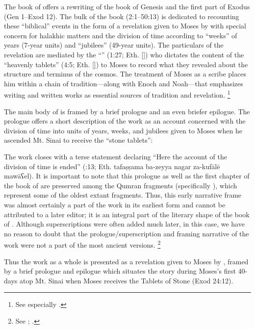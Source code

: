 The book of \jub offers a rewriting of the book of Genesis and the first part of Exodus (Gen 1--Exod 12).\autocite[1:17]{vanderkam2018} The bulk of the book (2:1--50:13) is dedicated to recounting these ``biblical'' events in the form of a revelation given to Moses by \yahweh with special concern for halakhic matters and the division of time according to ``weeks'' of years (7-year units) and ``jubilees'' (49-year units). The particulars of the revelation are mediated by the ``\ap'' (1:27; Eth.  []) who dictates the content of the ``heavenly tablets'' (4:5; Eth.  []) to Moses to record what they revealed about the structure and terminus of the cosmos.\autocite{martinez_najman-tigchelaar2012} The treatment of Moses as a scribe places him within a chain of tradition---along with Enoch and Noah---that emphasizes writing and written works as essential sources of tradition and revelation.%
        \footnote{See especially
                \cite[381--388]{najman_jsj1999}.} 

The main body of \jub is framed by a brief prologue and an even briefer epilogue. The prologue offers a short description of the work as an account concerned with the division of time into units of years, weeks, and jubilees given to Moses when he ascended Mt. Sinai to receive the ``stone tablets'':

%
\noindent
The work closes with a terse statement declaring ``Here the account of the division of time is ended'' (:13; Eth. 
        {tafaṣṣama ba-zeyya nagar za-kufālē mawāʕel}).
\noindent
It is important to note that this prologue as well as the first chapter of the book of \jub are preserved among the Qumran fragments (specifically ), which represent some of the oldest extant \jub fragments. Thus, this early narrative frame was almost certainly a part of the work in its earliest form and cannot be attributed to a later editor; it is an integral part of the literary shape of the book of \jub. Although superscriptions were often added much later, in this case, we have no reason to doubt that the prologue/superscription and framing narrative of the work were not a part of the most ancient versions.%
        \footnote{See 
                \cite[1:125]{vanderkam2018};
                \cite[25]{vanderkam_metso-etal2010}.}

Thus the work as a whole is presented as a revelation given to Moses by \yahweh, framed by a brief prologue and epilogue which situates the story during Moses's first 40-days atop Mt. Sinai when Moses receives the Tablets of Stone (Exod 24:12).\autocite[1:129]{vanderkam2018}
